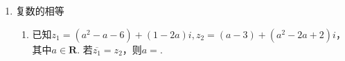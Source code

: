 \begin{enumerate}
\begin{enumerate}
\begin{jieda}
\begin{enumerate}[A.]
            \item $|z - \overline{z}| = 2|y|$
            \item 理由同上，反例：$z = 1$
            \item $z^2 = (x^2 - y^2) + (2xy)i$
        \end{enumerate}
    \end{jieda}
    \item 设复数$z = log_2\left(cos\alpha + \dfrac{1}{2}\right) + i log_2\left(sin\alpha + \dfrac{1}{2}\right)$，求$\alpha$使：$z$为实数，$z$为纯虚数，$z$的实部与虚部相等
    \begin{jieda}
    \end{jieda}
\end{enumerate}
\item 复数的相等
\begin{enumerate}
    \item 已知$z_1 = (a^2-a-6) + (1-2a)i, z_2 = (a-3) + (a^2 - 2a + 2)i$，其中$a \in \mathbf{R}$. 若$\overline{z_1} = z_2$，则$a = $.
\end{enumerate}
\end{enumerate}
